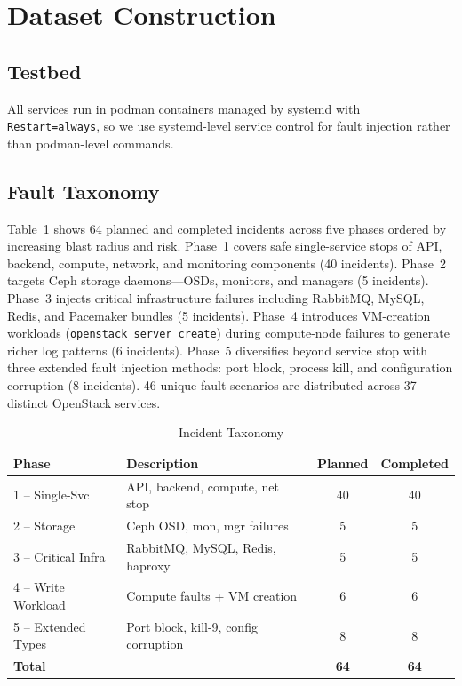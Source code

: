\documentclass[sigconf,review]{acmart}
\begin{document}
\section{Dataset Construction}
\label{sec:dataset}

\subsection{Testbed}

All services run in podman containers managed by systemd with \texttt{Restart=always}, so we use systemd-level service control for fault injection rather than podman-level commands.

\subsection{Fault Taxonomy}

Table~\ref{tab:taxonomy} shows 64 planned and completed incidents across five phases ordered by increasing blast radius and risk. Phase~1 covers safe single-service stops of API, backend, compute, network, and monitoring components (40 incidents). Phase~2 targets Ceph storage daemons---OSDs, monitors, and managers (5 incidents). Phase~3 injects critical infrastructure failures including RabbitMQ, MySQL, Redis, and Pacemaker bundles (5 incidents). Phase~4 introduces VM-creation workloads (\texttt{openstack server create}) during compute-node failures to generate richer log patterns (6 incidents). Phase~5 diversifies beyond service stop with three extended fault injection methods: port block, process kill, and configuration corruption (8 incidents). 46 unique fault scenarios are distributed across 37 distinct OpenStack services.

\begin{table}[ht]
\centering
\scriptsize
\caption{Incident Taxonomy}
\label{tab:taxonomy}
\begin{tabular}{@{}lp{3.2cm}cc@{}}
\toprule
\textbf{Phase} & \textbf{Description} & \textbf{Planned} & \textbf{Completed} \\
\midrule
1 -- Single-Svc & API, backend, compute, net stop & 40 & 40 \\
2 -- Storage & Ceph OSD, mon, mgr failures & 5 & 5 \\
3 -- Critical Infra & RabbitMQ, MySQL, Redis, haproxy & 5 & 5 \\
4 -- Write Workload & Compute faults + VM creation & 6 & 6 \\
5 -- Extended Types & Port block, kill-9, config corruption & 8 & 8 \\
\midrule
\textbf{Total} & & \textbf{64} & \textbf{64} \\
\bottomrule
\end{tabular}
\end{table}
\end{document}
